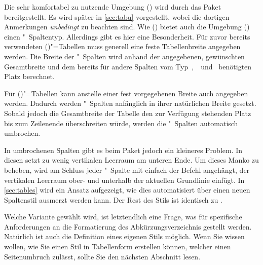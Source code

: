 \documentclass[%
  english,ngerman,%
  cdgeometry=no,DIV=12,automark,%
]{tudscrartcl}
\begin{document}
Die sehr komfortabel zu nutzende Umgebung () 
wird durch das Paket  bereitgestellt. Es wird später in 
\autoref{sec:tabu} vorgestellt, wobei die dortigen Anmerkungen \emph{unbedingt} 
zu beachten sind. Wie () bietet auch 
die Umgebung () einen "~Spaltentyp. 
Allerdings gibt es hier eine Besonderheit. Für zuvor bereits verwendeten 
()"=Tabellen muss generell eine feste 
Tabellenbreite angegeben werden. Die Breite der "~Spalten wird anhand 
der angegebenen, gewünschten Gesamtbreite und dem bereits für andere Spalten 
vom Typ~,~~und~ benötigten Platz berechnet. 

Für ()"=Tabellen kann anstelle einer fest 
vorgegebenen Breite auch  angegeben werden. Dadurch werden 
"~Spalten anfänglich in ihrer natürlichen Breite gesetzt. Sobald 
jedoch die Gesamtbreite der Tabelle den zur Verfügung stehenden Platz bis zum 
Zeilenende überschreiten würde, werden die "~Spalten automatisch 
umbrochen. 

In umbrochenen Spalten gibt es beim Paket  jedoch ein kleineres 
Problem. In diesen setzt  zu wenig vertikalen Leerraum am unteren 
Ende. Um dieses Manko zu beheben, wird am Schluss jeder "~Spalte mit 
 einfach der Befehl  
angehängt, der vertikalen Leerraum ober- und unterhalb der aktuellen Grundlinie 
einfügt. In \autoref{sec:tables} wird ein Ansatz aufgezeigt, wie dies 
automatisiert über einen neuen Spaltenstil ausmerzt werden kann. Der Rest des 
Stils ist identisch zu .
%
\CodeHook{\let\newglossarystyle\renewglossarystyle}
\begin{Preamble*}

\end{Preamble*}
\begin{Hint}
\printacronyms[style=acrotabu]
\end{Hint}
\begin{quoting}[rightmargin=0pt]
\glsdisablehyper
\InputCode
\end{quoting}
%
Welche Variante gewählt wird, ist letztendlich eine Frage, was für spezifische 
Anforderungen an die Formatierung des Abkürzungsverzeichnis gestellt werden. 
Natürlich ist auch die Definition eines eigenen Stils möglich. Wenn Sie wissen 
wollen, wie Sie einen Stil in Tabellenform erstellen können, welcher einen 
Seitenumbruch zulässt, sollte Sie den nächsten Abschnitt lesen.
\end{document}
